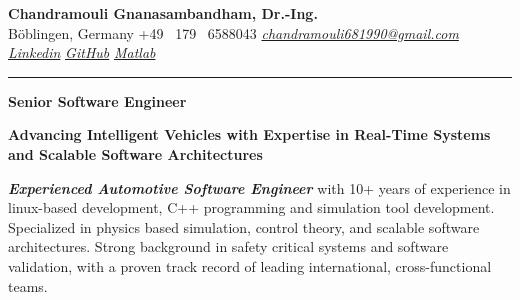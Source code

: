 \documentclass[a4paper,10pt]{article}
\newcommand{\link}[1]{{\textit{#1}}}
\begin{document}
\thispagestyle{plain}

\begin{center}
    {\Large \textbf{Chandramouli Gnanasambandham, Dr.-Ing.}}\\ 
    
    \vspace{0.2cm}
    \small B\"oblingen, Germany \hfill  \bullet  \hfill  +49 \ 179 \ 6588043 \hfill \bullet  \hfill
    \textup{\href{mailto:chandramouli681990@gmail.com}{\link{chandramouli681990@gmail.com}}} \hfill \bullet \hfill
    \textup{\href{https://linkedin.com/in/ganasambandhamc}{\link{Linkedin}}} \hfill \bullet \hfill
    \textup{\href{https://github.com/chandramouli6890}{\link{GitHub}}} \hfill \bullet \hfill
    \textup{\href{https://de.mathworks.com/matlabcentral/profile/authors/4267772}{\link{Matlab}}}

    \vspace{-0.2cm}
    {\rule{\linewidth}{0.8pt}}

    \vspace{0.2cm}
    {\Large \textbf{Senior Software Engineer}}
    
    \vspace{0.1cm}
    \colorbox{gray!40}{%
        \parbox{0.99\textwidth}{%
            \centering \textcolor{highlightcolor}{\textbf{Advancing Intelligent Vehicles with Expertise in Real-Time Systems and Scalable Software Architectures}}
        }%
    }
\end{center}


\noindent \textcolor{highlightcolor}{\textit{\textbf{Experienced Automotive 
Software Engineer}}} 
with 10+ years of experience in linux-based development, C++ programming
and simulation tool development. Specialized in physics based simulation, control theory,
and scalable software architectures. Strong background in safety critical
systems and software validation, with a proven track record of leading
international, cross-functional teams.
\end{document}
